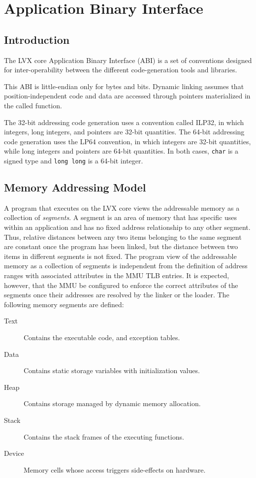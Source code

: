 \section{Application Binary Interface}

\subsection{Introduction}

The LVX core Application Binary Interface (ABI) is a set of conventions
designed for inter-operability between the different code-generation tools and
libraries.

This ABI is little-endian only for bytes and bits.
Dynamic linking assumes that position-independent code and data are accessed
through pointers materialized in the called function.

The 32-bit addressing code generation uses a convention called ILP32, in which
integers, long integers, and pointers are 32-bit quantities. The 64-bit
addressing code generation uses the LP64 convention, in which integers are
32-bit quantities, while long integers and pointers are 64-bit quantities. In
both cases, \texttt{char} is a signed type and \texttt{long long} is a 64-bit
integer.

\subsection{Memory Addressing Model}

A program that executes on the LVX core views the addressable memory
as a collection of \emph{segments}. A segment is an area of memory that has
specific uses within an application and has no fixed address relationship to any
other segment. Thus, relative distances between any two items belonging to the
same segment are constant once the program has been linked, but the distance
between two items in different segments is not fixed. The program view of the
addressable memory as a collection of segments is independent from the
definition of address ranges with associated attributes in the MMU TLB entries.
It is expected, however, that the MMU be configured to enforce the correct
attributes of the segments once their addresses are resolved by the linker or
the loader.  The following memory segments are defined: \begin{description}

\item[Text] Contains the executable code, and exception tables.

\item[Data] Contains static storage variables with initialization values.

\item[Heap] Contains storage managed by dynamic memory allocation.

\item[Stack] Contains the stack frames of the executing functions.

\item[Device] Memory cells whose access triggers side-effects on hardware.

\end{description}

